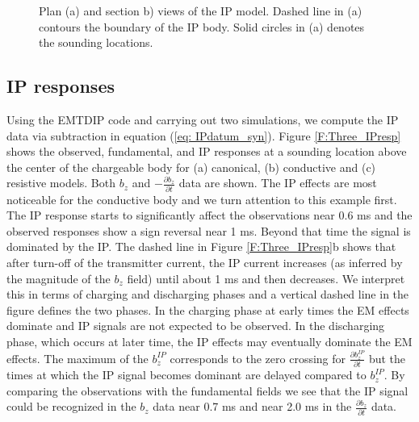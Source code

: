 \documentclass[extra,mreferee]{gji}
\begin{document}
\begin{figure}
  \caption{Plan (a) and section b) views of the IP model. Dashed line in (a) contours the boundary of the IP body. Solid circles in (a) denotes the sounding locations.}
  \label{F: IPModel}
\end{figure}
\clearpage

\subsection{IP responses}
Using the  EMTDIP code and carrying out two simulations, we compute the IP data via subtraction in equation (\ref{eq: IPdatum_syn}).
Figure \ref{F:Three_IPresp} shows the observed, fundamental, and IP responses at a sounding location above the center of the chargeable body for (a) canonical, (b) conductive and (c) resistive models. Both $b_z$ and $-\frac{\partial b_z}{\partial t}$ data are shown. 
The IP effects are most noticeable for the conductive body and we turn attention to this example first. The IP response starts to significantly affect the observations near 0.6 ms and the observed responses show a sign reversal near 1 ms. Beyond that time the signal is dominated by the IP. The dashed line in Figure \ref{F:Three_IPresp}b shows that after turn-off of the transmitter current, the IP current increases (as inferred by the magnitude of the $b_z$ field) until about 1 ms and then decreases. We interpret this in terms of charging and discharging phases and a vertical dashed line in the figure defines the two phases. In the charging phase at early times the EM effects dominate and IP signals are not expected to be observed. In the discharging phase, which occurs at  later time, the IP effects may eventually dominate the EM effects. The maximum of the $b_z^{IP}$ corresponds to the zero crossing for $\frac{\partial b_z^{IP}}{\partial t}$ but the times at which the IP signal becomes dominant are delayed compared to $b_z^{IP}$. By comparing the observations with the fundamental fields we see that the IP signal could be recognized in the $b_z$ data near 0.7 ms and near 2.0 ms in the $\frac{\partial b_z}{\partial t}$ data.
\end{document}
